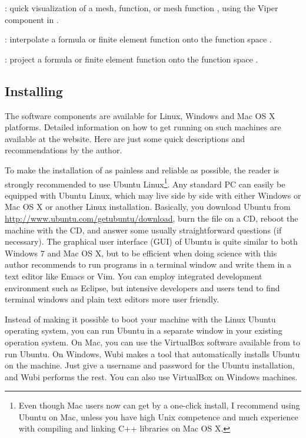 : quick visualization of a mesh, function, or mesh function
, using the Viper component in \fenics{}.\gln

: interpolate a formula or finite
element function 
onto the function space .\gln

: project a formula or finite element function 
onto the function space .\gln

\subsection{Installing \fenics}
\label{langtangen:app:install}
\label{installing FEniCS}

The \fenics{} software components are available for Linux, Windows and Mac OS
X platforms. Detailed information on how to get \fenics{} running on such
machines are available at the  website.
Here are just some quick descriptions and recommendations by the author.

To make the installation of \fenics{} as painless and reliable as
possible, the reader is strongly recommended to use Ubuntu
Linux\footnote{Even though Mac users now can get \fenics{} by a
  one-click install, I recommend using Ubuntu on Mac, unless you have
  high Unix competence and much experience with compiling and linking
  C++ libraries on Mac OS X.}. Any standard PC can easily be equipped
with Ubuntu Linux, which may live side by side with either Windows or
Mac OS X or another Linux installation.  Basically, you download
Ubuntu from \url{http://www.ubuntu.com/getubuntu/download}, burn the
file on a CD, reboot the machine with the CD, and answer some usually
straightforward questions (if necessary). The graphical user interface
(GUI) of Ubuntu is quite similar to both Windows 7 and Mac OS X, but
to be efficient when doing science with \fenics{} this author
recommends to run programs in a terminal window and write them in a
text editor like Emacs or Vim. You can employ integrated development
environment such as Eclipse, but intensive \fenics{} developers and
users tend to find terminal windows and plain text editors more user
friendly.

Instead of making it possible to boot your machine with the Linux
Ubuntu operating system, you can run Ubuntu in a separate window in
your existing operation system. On Mac, you can use the VirtualBox
software available from  to run
Ubuntu. On Windows, Wubi makes a tool that automatically installs
Ubuntu on the machine. Just give a username and password for the
Ubuntu installation, and Wubi performs the rest. You can also use
VirtualBox on Windows machines.

